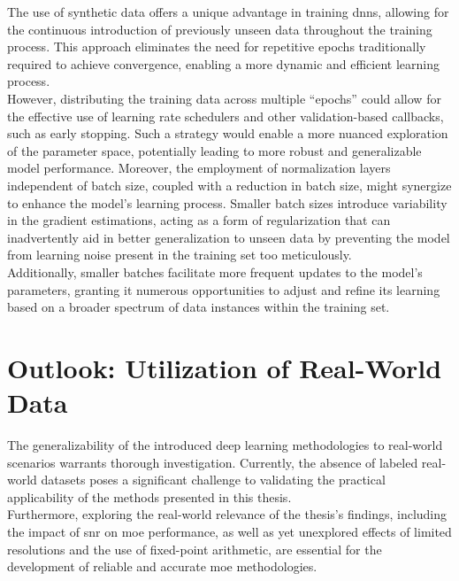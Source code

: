 The use of synthetic data offers a unique advantage in training \glspl{dnn}, allowing for the continuous
introduction of previously unseen data throughout the training process.
This approach eliminates the need for repetitive epochs traditionally required to achieve convergence, enabling a more
dynamic and efficient learning process. \\
However, distributing the training data across multiple ``epochs'' could allow for the effective use of learning rate
schedulers and other validation-based callbacks, such as early stopping. Such a strategy would enable a more nuanced
exploration of the parameter space, potentially leading to more robust and generalizable model performance.
Moreover, the employment of normalization layers independent of batch size, coupled with a reduction in batch size, might
synergize to enhance the model's learning process.
Smaller batch sizes introduce variability in the gradient estimations, acting as a form of regularization that can
inadvertently aid in better generalization to unseen data by preventing the model from learning noise present in the
training set too meticulously. \\
Additionally, smaller batches facilitate more frequent updates to the model's parameters, granting it numerous opportunities
to adjust and refine its learning based on a broader spectrum of data instances within the training set.


\section{Outlook: Utilization of Real-World Data}
The generalizability of the introduced deep learning methodologies to real-world scenarios warrants thorough investigation.
Currently, the absence of labeled real-world datasets poses a significant challenge to validating the practical applicability
of the methods presented in this thesis. \\
Furthermore, exploring the real-world relevance of the thesis's findings, including the
impact of \gls{snr} on \gls{moe} performance, as well as yet unexplored effects of limited resolutions and
the use of fixed-point arithmetic, are essential for the development of reliable and accurate \gls{moe} methodologies.

